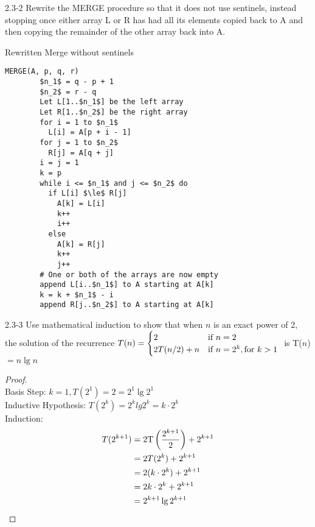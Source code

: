 \begin{problem}{2.3-2}
  Rewrite the MERGE procedure so that it does not use sentinels, instead stopping once either array L or R has had all its
  elements copied back to A and then copying the remainder of the other array back into A.

  \begin{solution}
   \centerline{Rewritten Merge without sentinels}
    \begin{lstlisting}[mathescape]
      MERGE(A, p, q, r)
        $n_1$ = q - p + 1
        $n_2$ = r - q
        Let L[1..$n_1$] be the left array
        Let R[1..$n_2$] be the right array
        for i = 1 to $n_1$
          L[i] = A[p + i - 1]
        for j = 1 to $n_2$
          R[j] = A[q + j]
        i = j = 1
        k = p
        while i <= $n_1$ and j <= $n_2$ do
          if L[i] $\le$ R[j]
            A[k] = L[i]
            k++
            i++
          else
            A[k] = R[j]
            k++
            j++
        # One or both of the arrays are now empty
        append L[i..$n_1$] to A starting at A[k]
        k = k + $n_1$ - i
        append R[j..$n_2$] to A starting at A[k]
    \end{lstlisting}
  \end{solution}
\end{problem} \newpage

\begin{problem}{2.3-3}
  Use mathematical induction to show that when $n$ is an exact power of 2, the solution of the recurrence
  $T(n) = \begin{cases}
    2 & \text{if } n = 2 \\
    2T(n/2) + n & \text{if } n = 2^k, \text{for } k >1
  \end{cases} \\
  $ is T($n$)$=n \lg n$
  \begin{proof}\ \\
    Basis Step: $k = 1, T(2^1) = 2 = 2^1 \lg 2^1$ \\
    Inductive Hypothesis: $T(2^k) = 2^k lg 2^k = k \cdot 2^k$ \\
    Induction: \begin{align*}
      T(2^{k+1}) &= 2\text{T}\left(\frac{2^{k+1}}{2}\right) + 2^{k+1} \\
      &= 2T(2^k) + 2^{k+1} \\
      &= 2(k \cdot 2^k) + 2^{k+1} \\
      &= 2k \cdot 2^k + 2^{k+1} \\
      &= 2^{k + 1} \lg 2^{k+1} \qedhere
    \end{align*}

  \end{proof}
\end{problem}

